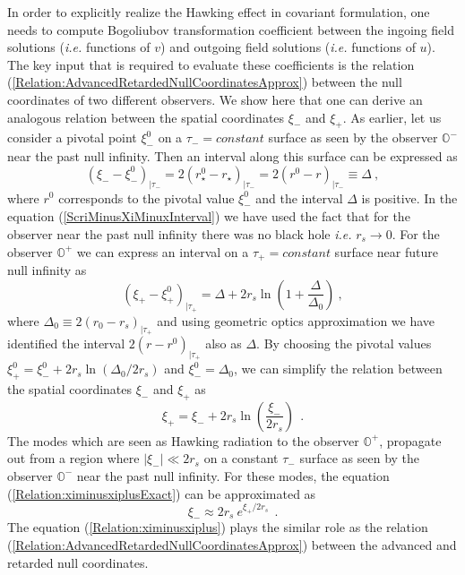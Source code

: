 \documentclass[aps,twocolumn,showpacs]{revtex4}
\def\rs{r_s}
\def\rstar{r_{\star}}
\def\observerminus{\mathbb{O}^{-}}
\def\observerplus{\mathbb{O}^{+}}
\begin{document}
In order to explicitly realize the Hawking effect in covariant formulation, one 
needs to compute Bogoliubov transformation coefficient between the ingoing 
field solutions (\emph{i.e.} functions of $v$) and outgoing field solutions 
(\emph{i.e.} functions of $u$). The key input that is required to evaluate 
these coefficients is the relation 
(\ref{Relation:AdvancedRetardedNullCoordinatesApprox}) between the null
coordinates of two different observers. We show here that one can derive an
analogous relation between the spatial coordinates $\xi_{-}$ and $\xi_{+}$. As 
earlier, let us consider a pivotal point $\xi_{-}^0$ on a $\tau_{-} = 
constant$ surface as seen by the observer $\observerminus$ near the past 
null infinity. Then an interval along this surface can be expressed as
%
\begin{equation}\label{ScriMinusXiMinuxInterval}
(\xi_{-} - \xi_{-}^0)_{|\tau_{-}} = 2(\rstar^0-\rstar)_{|\tau_{-}} =
2(r^0-r)_{|\tau_{-}} \equiv \Delta ~, 
\end{equation}
%
where $r^0$ corresponds to the pivotal value $\xi_{-}^0$ and the interval 
$\Delta$ is positive. In the equation (\ref{ScriMinusXiMinuxInterval})
we have used the fact that for the observer near the past null infinity there 
was no black hole \emph{i.e.} $\rs\to0$. For the observer $\observerplus$ we can 
express an interval on a $\tau_{+} = constant$ surface near future null infinity 
as
%
\begin{equation}\label{ScriMinusXiPlusInterval}
(\xi_{+} - \xi_{+}^0)_{|\tau_{+}} 
= \Delta + 2\rs \ln \left(1 + \frac{\Delta}{\Delta_0}\right)
 ~,
\end{equation}
%
where $\Delta_0 \equiv 2(r_0 - \rs)_{|\tau_{+}}$ and using geometric optics 
approximation we have identified the interval $2(r - r^0)_{|\tau_{+}}$ also as 
$\Delta$.  By choosing the pivotal values 
$\xi_{+}^0 = \xi_{-}^0 + 2\rs \ln (\Delta_0/2\rs)$ and $\xi_{-}^0 = \Delta_0$, 
we can simplify the relation  between the spatial coordinates $\xi_{-}$ and 
$\xi_{+}$ as
\begin{equation}\label{Relation:ximinusxiplusExact}
\xi_{+} = \xi_{-} + 2\rs \ln \left(\frac{\xi_{-}}{2\rs}\right) ~~.
\end{equation}
%
The modes which are seen as Hawking radiation to the observer $\observerplus$, 
propagate out from a region where $|\xi_{-}| \ll 2\rs$ on a constant $\tau_{-}$ 
surface as seen by the observer $\observerminus$ near the past null infinity. 
For these modes, the equation (\ref{Relation:ximinusxiplusExact}) can be 
approximated as
%
\begin{equation}\label{Relation:ximinusxiplus}
\xi_{-} \approx  2 \rs~e^{\xi_{+}/2 \rs} ~~.
\end{equation}
%
The equation (\ref{Relation:ximinusxiplus}) plays the similar role as the 
relation (\ref{Relation:AdvancedRetardedNullCoordinatesApprox}) between the 
advanced and retarded null coordinates.
\end{document}
